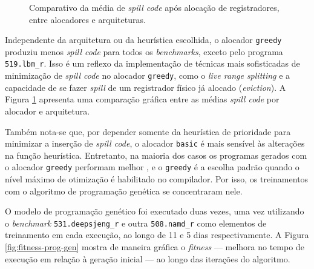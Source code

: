 \documentclass[
	12pt,				%
	openright,			%
	twoside,			%
	a4paper,			%
	tcc,			%
	]{ABNT-DC-UEL}
\begin{document}
\begin{figure}[htb]
    \caption{Comparativo da média de \textit{spill code} após alocação de registradores, entre alocadores e arquiteturas.}
    \label{fig:bernstein-stores-basic}
\end{figure}

Independente da arquitetura ou da heurística escolhida, o alocador \texttt{greedy} produziu menos \textit{spill code} para todos os \textit{benchmarks}, exceto pelo programa \texttt{519.lbm\_r}. Isso é um reflexo da implementação de técnicas mais sofisticadas de minimização de \textit{spill code} no alocador \texttt{greedy}, como o \textit{live range splitting} e a capacidade de se fazer \textit{spill} de um registrador físico já alocado (\textit{eviction}). A Figura \ref{fig:bernstein-stores-basic} apresenta uma comparação gráfica entre as médias \textit{spill code} por alocador e arquitetura.

Também nota-se que, por depender somente da heurística de prioridade para minimizar a inserção de \textit{spill code}, o alocador \texttt{basic} é mais sensível às alterações na função heurística. Entretanto, na maioria dos casos os programas gerados com o alocador \texttt{greedy} performam melhor \cite{xavier:12, venkatakeerthy:23}, e o \texttt{greedy} é a escolha padrão quando o nível máximo de otimização é habilitado no compilador. Por isso, os treinamentos com o algoritmo de programação genética se concentraram nele.

 \runtimesdeepsjeng

O modelo de programação genético foi executado duas vezes, uma vez utilizando o \textit{benchmark} \texttt{531.deepsjeng\_r} e outra \texttt{508.namd\_r} como elementos de treinamento em cada execução, ao longo de 11 e 5 dias respectivamente. A Figura \ref{fig:fitness-prog-gen} mostra de maneira gráfica o \textit{fitness} --- melhora no tempo de execução em relação à geração inicial --- ao longo das iterações do algoritmo. 
\end{document}
